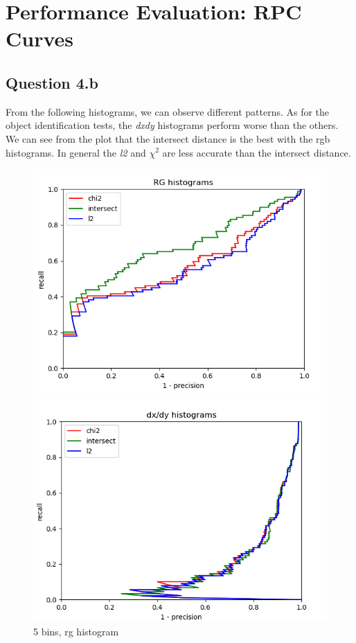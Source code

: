 \documentclass{article}
\begin{document}
\newpage
\section{Performance Evaluation: RPC Curves}
\subsection{Question 4.b}
From the following histograms, we can observe different patterns. As for the object identification tests, the \textit{dxdy} histograms perform worse than the others.
We can see from the plot that the intersect distance is the best with the rgb histograms. In general the \textit{l2} and $\chi^2$ are less accurate than the intersect distance.

\begin{figure}[ht]
    \centering
    \begin{minipage}{.5\textwidth}
        \includegraphics[width=\linewidth]{images/Q4.b-rg_histogram_5_bins.png}
        \cprotect\caption{5 bins, rg histogram}
    \end{minipage}\hfill
    \begin{minipage}{.5\textwidth}
        \includegraphics[width=\linewidth]{images/Q4.b-dxdy_histogram_5_bins.png}

\end{minipage}
\end{figure}
\end{document}
